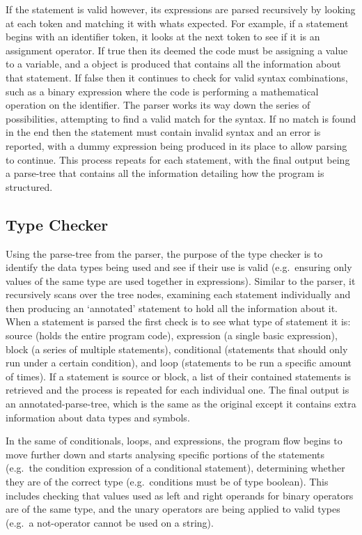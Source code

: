 \documentclass[
]{report}
\begin{document}
If the \gls{statement} is valid however, its \glspl{expression} are parsed
recursively by looking at each \gls{token} and matching it with whats
expected. For example, if a \gls{statement} begins with an \gls{identifier} \gls{token},
it looks at the next \gls{token} to see if it is an assignment operator. If
true then its deemed the code must be assigning a value to a variable,
and a object is produced that contains all the information about that
\gls{statement}. If false then it continues to check for valid syntax
combinations, such as a binary \gls{expression} where the code is performing a
mathematical operation on the \gls{identifier}. The parser works its way down
the series of possibilities, attempting to find a valid match for the
syntax. If no match is found in the end then the \gls{statement} must contain
invalid syntax and an error is reported, with a dummy \gls{expression} being
produced in its place to allow \gls{parsing} to continue. This process repeats
for each \gls{statement}, with the final output being a \gls{parse-tree} that
contains all the information detailing how the program is structured.

\subsection{Type Checker}
Using the \gls{parse-tree} from the parser, the purpose of the type checker is
to identify the data types being used and see if their use is valid
(e.g.~ensuring only values of the same type are used together in
\glspl{expression}). Similar to the parser, it recursively scans over the tree
nodes, examining each \gls{statement} individually and then producing an
`annotated' \gls{statement} to hold all the information about it. When a
\gls{statement} is parsed the first check is to see what type of \gls{statement} it
is: source (holds the entire program code), \gls{expression} (a single basic
\gls{expression}), block (a series of multiple \glspl{statement}), conditional
(\glspl{statement} that should only run under a certain condition), and loop
(\glspl{statement} to be run a specific amount of times). If a \gls{statement} is
source or block, a list of their contained \glspl{statement} is retrieved and
the process is repeated for each individual one. The final output is an
\gls{annotated-parse-tree}, which is the same as the original except it
contains extra information about data types and \glspl{symbol}.

In the same of conditionals, loops, and \glspl{expression}, the program flow
begins to move further down and starts analysing specific portions of
the \glspl{statement} (e.g.~the condition \gls{expression} of a conditional
\gls{statement}), determining whether they are of the correct type
(e.g.~conditions must be of type boolean). This includes checking that
values used as left and right operands for binary operators are of the
same type, and the unary operators are being applied to valid types
(e.g.~a not-operator cannot be used on a string).
\end{document}
